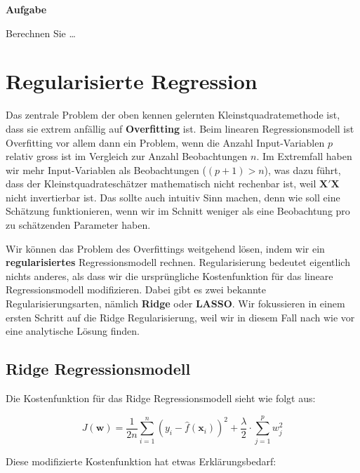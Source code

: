\documentclass[
]{book}
\begin{document}
\textbf{Aufgabe}

Berechnen Sie \ldots{}

\hypertarget{regularisierte-regression}{%
\section{Regularisierte Regression}\label{regularisierte-regression}}

Das zentrale Problem der oben kennen gelernten Kleinstquadratemethode ist, dass sie extrem anfällig auf \textbf{Overfitting} ist. Beim linearen Regressionsmodell ist Overfitting vor allem dann ein Problem, wenn die Anzahl Input-Variablen \(p\) relativ gross ist im Vergleich zur Anzahl Beobachtungen \(n\). Im Extremfall haben wir mehr Input-Variablen als Beobachtungen (\((p+1)>n\)), was dazu führt, dass der Kleinstquadrateschätzer mathematisch nicht rechenbar ist, weil \(\mathbf{X}'\mathbf{X}\) nicht invertierbar ist. Das sollte auch intuitiv Sinn machen, denn wie soll eine Schätzung funktionieren, wenn wir im Schnitt weniger als eine Beobachtung pro zu schätzenden Parameter haben.

Wir können das Problem des Overfittings weitgehend lösen, indem wir ein \textbf{regularisiertes} Regressionsmodell rechnen. Regularisierung bedeutet eigentlich nichts anderes, als dass wir die ursprüngliche Kostenfunktion für das lineare Regressionsmodell modifizieren. Dabei gibt es zwei bekannte Regularisierungsarten, nämlich \textbf{Ridge} oder \textbf{LASSO}. Wir fokussieren in einem ersten Schritt auf die Ridge Regularisierung, weil wir in diesem Fall nach wie vor eine analytische Lösung finden.

\hypertarget{ridge-regressionsmodell}{%
\subsection{Ridge Regressionsmodell}\label{ridge-regressionsmodell}}

Die Kostenfunktion für das Ridge Regressionsmodell sieht wie folgt aus:

\[
J(\mathbf{w}) = \frac{1}{2n} \sum_{i=1}^{n} \left(y_i - \hat{f}(\mathbf{x}_i) \right)^2 + \frac{\lambda}{2} \cdot \sum_{j=1}^p w_j^2
\]

Diese modifizierte Kostenfunktion hat etwas Erklärungsbedarf:
\end{document}
